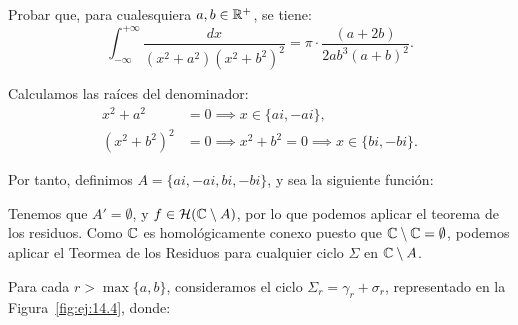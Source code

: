 \begin{ejercicio}\label{ej:14.4}
    Probar que, para cualesquiera $a, b \in \mathbb{R}^+$, se tiene:
    \begin{equation*}
        \int_{-\infty}^{+\infty} \frac{dx}{(x^2 + a^2)(x^2 + b^2)^2} = \pi\cdot \frac{(a + 2b)}{2ab^3(a + b)^2}.
    \end{equation*}

    Calculamos las raíces del denominador:
    \begin{align*}
        x^2 + a^2 &= 0 \implies x\in \{ai, -ai\}, \\
        (x^2 + b^2)^2 &= 0 \implies x^2 + b^2 = 0 \implies x\in \{bi, -bi\}.
    \end{align*}

    Por tanto, definimos $A=\{ai, -ai, bi, -bi\}$, y sea la siguiente función:
    
    Tenemos que $A'=\emptyset$, y $f\in \mathcal{H}(\mathbb{C}\setminus A)$, por lo que podemos aplicar el teorema de los residuos. Como $\mathbb{C}$ es homológicamente conexo puesto que $\mathbb{C}\setminus \mathbb{C}=\emptyset$, podemos aplicar el Teormea de los Residuos para cualquier ciclo $\Sigma$ en $\mathbb{C}\setminus A$. 
    
    Para cada $r>\max\{a,b\}$, consideramos el ciclo $\Sigma_r = \gamma_r + \sigma_r$, representado en la Figura~\ref{fig:ej:14.4}, donde:
    \begin{figure}
        \centering
\end{figure}
\end{ejercicio}
